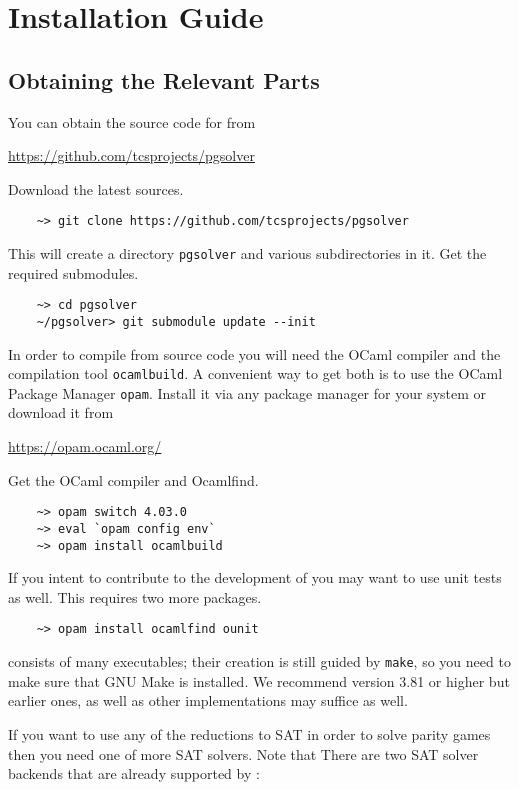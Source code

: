\section{Installation Guide}

\subsection{Obtaining the Relevant Parts}

You can obtain the source code for \pgsolver from
\begin{center}
    \url{https://github.com/tcsprojects/pgsolver}
\end{center}
Download the latest sources.
\begin{verbatim}
    ~> git clone https://github.com/tcsprojects/pgsolver
\end{verbatim}
This will create a directory \texttt{pgsolver} and various subdirectories in it. Get the required submodules.
\begin{verbatim}
    ~> cd pgsolver
    ~/pgsolver> git submodule update --init
\end{verbatim}

In order to compile \pgsolver from source code you will need the OCaml compiler and the compilation tool \texttt{ocamlbuild}. A convenient way to get
both is to use the OCaml Package Manager \texttt{opam}. Install it via any package manager for your system or download it from
\begin{center}
\url{https://opam.ocaml.org/}
\end{center}
Get the OCaml compiler and Ocamlfind.
\begin{verbatim}
    ~> opam switch 4.03.0 
    ~> eval `opam config env`
    ~> opam install ocamlbuild
\end{verbatim}

If you intent to contribute to the development of \pgsolver you may want to use unit tests as well. This requires two more packages.
\begin{verbatim}
    ~> opam install ocamlfind ounit  
\end{verbatim}
  
\pgsolver consists of many executables; their creation is still guided by \texttt{make}, so you need to make sure that GNU Make
is installed. We recommend version 3.81 or higher but earlier ones, as well as other implementations may suffice as well.

If you want to use any of the reductions to SAT in order to solve parity games then you need one of more SAT solvers. Note that
There are two SAT solver backends that are already supported by
      \pgsolver:

